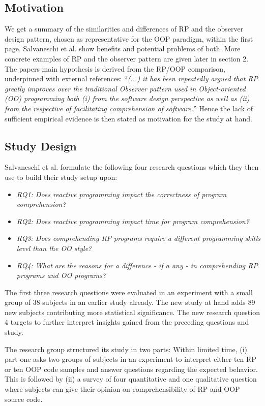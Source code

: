 \documentclass[12pt,a4paper]{article}
\begin{document}
\subsection{Motivation}
We get a summary of the similarities and differences of RP and the observer design pattern, chosen as representative for the OOP paradigm, within the first page. Salvaneschi et al. show benefits and potential problems of both. More concrete examples of RP and the observer pattern are given later in section 2. The papers main hypothesis is derived from the RP/OOP comparison, underpinned with external references: ``\emph{(...) it has been repeatedly argued that RP greatly improves over the traditional Observer pattern used in Object-oriented (OO) programming both (i) from the software design perspective as well as (ii) from the respective of facilitating comprehension of software.}'' Hence the lack of sufficient empirical evidence is then stated as motivation for the study at hand.

\subsection{Study Design}
Salvaneschi et al. formulate the following four research questions which they then use to build their study setup upon:

\begin{itemize}
	\item \emph{RQ1: Does reactive programming impact the correctness of program comprehension?}
	\item \emph{RQ2: Does reactive programming impact time for program comprehension?}
	\item \emph{RQ3: Does comprehending RP programs require a different programming skills level than the OO style?}
	\item \emph{RQ4: What are the reasons for a difference - if a any - in comprehending RP programs and OO programs?}
\end{itemize}

The first three research questions were evaluated in an experiment with a small group of 38 subjects in an earlier study \cite{Salvaneschi:2014:ESP:2635868.2635895} already. The new study at hand adds 89 new subjects contributing more statistical significance. The new research question 4 targets to further interpret insights gained from the preceding questions and study.

The research group structured its study in two parts: Within limited time, (i) part one asks two groups of subjects in an experiment to interpret either ten RP or ten OOP code samples and answer questions regarding the expected behavior. This is followed by (ii) a survey of four quantitative and one qualitative question where subjects can give their opinion on comprehensibility of RP and OOP source code.
\end{document}
